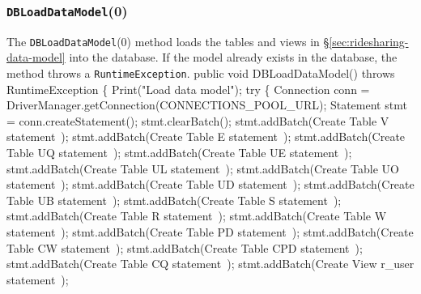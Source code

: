 \documentclass{article}
\theoremstyle{definition}                   %
\begin{document}
\subsubsection{{\tt{}\protect{}DBLoadDataModel}(0)}
The {\tt{}\protect{}DBLoadDataModel}(0) method loads the tables and views in
\S\ref{sec:ridesharing-data-model} into the database. If the model already
exists in the database, the method throws a {\tt{}RuntimeException}.
\nwenddocs{}\endmoddef{}
public void DBLoadDataModel() throws RuntimeException \{
  Print("Load data model");
  try \{
    Connection conn = DriverManager.getConnection(CONNECTIONS_POOL_URL);
    Statement stmt = conn.createStatement();
    stmt.clearBatch();
    stmt.addBatch(\LA{}Create Table V statement~{\nwtagstyle{}}\RA{});
    stmt.addBatch(\LA{}Create Table E statement~{\nwtagstyle{}}\RA{});
    stmt.addBatch(\LA{}Create Table UQ statement~{\nwtagstyle{}}\RA{});
    stmt.addBatch(\LA{}Create Table UE statement~{\nwtagstyle{}}\RA{});
    stmt.addBatch(\LA{}Create Table UL statement~{\nwtagstyle{}}\RA{});
    stmt.addBatch(\LA{}Create Table UO statement~{\nwtagstyle{}}\RA{});
    stmt.addBatch(\LA{}Create Table UD statement~{\nwtagstyle{}}\RA{});
    stmt.addBatch(\LA{}Create Table UB statement~{\nwtagstyle{}}\RA{});
    stmt.addBatch(\LA{}Create Table S statement~{\nwtagstyle{}}\RA{});
    stmt.addBatch(\LA{}Create Table R statement~{\nwtagstyle{}}\RA{});
    stmt.addBatch(\LA{}Create Table W statement~{\nwtagstyle{}}\RA{});
    stmt.addBatch(\LA{}Create Table PD statement~{\nwtagstyle{}}\RA{});
    stmt.addBatch(\LA{}Create Table CW statement~{\nwtagstyle{}}\RA{});
    stmt.addBatch(\LA{}Create Table CPD statement~{\nwtagstyle{}}\RA{});
    stmt.addBatch(\LA{}Create Table CQ statement~{\nwtagstyle{}}\RA{});
    stmt.addBatch(\LA{}Create View r\_user statement~{\nwtagstyle{}}\RA{});
\end{document}
